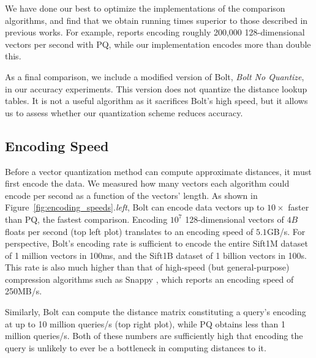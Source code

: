 We have done our best to optimize the implementations of the comparison algorithms, and find that we obtain running times superior to those described in previous works. For example, \cite{stackedQuantizers} reports encoding roughly 200,000 128-dimensional vectors per second with PQ, while our implementation encodes more than double this. %

As a final comparison, we include a modified version of Bolt, \textit{Bolt No Quantize}, in our accuracy experiments. This version does not quantize the distance lookup tables. It is not a useful algorithm as it sacrifices Bolt's high speed, but it allows us to assess whether our quantization scheme reduces accuracy.

\vspace{-2mm}
\subsection{Encoding Speed}

Before a vector quantization method can compute approximate distances, it must first encode the data. We measured how many vectors each algorithm could encode per second as a function of the vectors' length. As shown in Figure~\ref{fig:encoding_speeds}.\textit{left}, Bolt can encode data vectors up to $10\times$ faster than PQ, the fastest comparison. Encoding $10^7$ 128-dimensional vectors of $4B$ floats per second (top left plot) translates to an encoding speed of $5.1$GB/s. For perspective, Bolt's encoding rate is sufficient to encode the entire Sift1M dataset of 1 million vectors in 100ms, and the Sift1B dataset of 1 billion vectors in 100s. This rate is also much higher than that of high-speed (but general-purpose) compression algorithms such as Snappy \cite{snappy}, which reports an encoding speed of 250MB/s.

Similarly, Bolt can compute the distance matrix constituting a query's encoding at up to 10 million queries/s (top right plot), while PQ obtains less than 1 million queries/s. Both of these numbers are sufficiently high that encoding the query is unlikely to ever be a bottleneck in computing distances to it.

